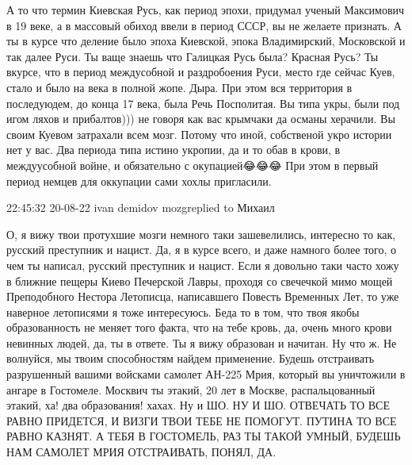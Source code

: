 А то что термин Киевская Русь, как период эпохи, придумал ученый Максимович в 19 веке, а в массовый обиход ввели в период СССР, вы не желаете признать.
А ты в курсе что деление было эпоха Киевской, эпока Владимирский, Московской и так далее Руси. Ты ваще знаешь что Галицкая Русь была? Красная Русь?
Ты вкурсе, что в период междусобной и раздробоения Руси, место где сейчас Куев, стало и было на века в полной жопе. Дыра.
При этом вся территория в последуюдем, до конца 17 века, была Речь Посполитая.
Вы типа укры, были под игом ляхов и прибалтов))) не говоря как вас крымчаки да османы херачили.
Вы своим Куевом затрахали всем мозг. Потому что иной, собственой укро истории нет у вас. Два периода типа истино укропии, да и то обав в крови, в междуусобной войне, и обязательно с окупацией😂😂😂 При этом в первый период немцев для оккупации сами хохлы пригласили.


22:45:32 20-08-22
ivan demidov mozgreplied to Михаил

О, я вижу твои протухшие мозги немного таки зашевелились, интересно то как,
русский преступник и нацист. Да, я в курсе всего, и даже намного более того, о
чем ты написал, русский преступник и нацист. Если я довольно таки часто хожу в
ближние пещеры Киево Печерской Лавры, проходя со свечечкой мимо мощей
Преподобного Нестора Летописца, написавшего Повесть Временных Лет, то уже
наверное летописями я тоже интересуюсь. Беда то в том, что твоя якобы
образованность не меняет того факта, что на тебе кровь, да, очень много крови
невинных людей, да, ты в ответе. Ты я вижу образован и начитан. Ну что ж. Не
волнуйся, мы твоим способностям найдем применение. Будешь отстраивать
разрушенный вашими войсками самолет АН-225 Мрия, который вы уничтожили в ангаре
в Гостомеле. Москвич ты этакий, 20 лет в Москве, распальцованный этакий, ха!
два образования! хахах. Ну и ШО. НУ И ШО. ОТВЕЧАТЬ ТО ВСЕ РАВНО ПРИДЕТСЯ, И
ВИЗГИ ТВОИ ТЕБЕ НЕ ПОМОГУТ. ПУТИНА ТО ВСЕ РАВНО КАЗНЯТ. А ТЕБЯ В ГОСТОМЕЛЬ, РАЗ
ТЫ ТАКОЙ УМНЫЙ, БУДЕШЬ НАМ САМОЛЕТ МРИЯ ОТСТРАИВАТЬ, ПОНЯЛ, ДА.

